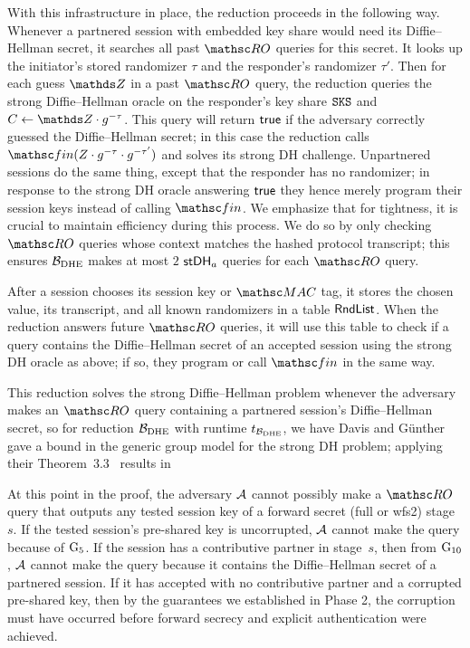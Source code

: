 With this infrastructure in place, the reduction proceeds in the following way.
Whenever a partnered session with embedded key share would need its Diffie--Hellman secret, it searches all past $\RO$ queries for this secret.
It looks up the initiator's stored randomizer $\tau$ and the responder's randomizer $\tau'$.
Then for each guess $\Z$ in a past $\RO$ query, the reduction queries the strong Diffie--Hellman oracle on the responder's key share $\mathtt{SKS}$ and $C \assign \Z \cdot g^{-\tau} $.
This query will return $\mathsf{true}$ if the adversary correctly guessed the Diffie--Hellman secret; in this case the reduction calls $\Finalize(Z \cdot g^{-\tau} \cdot g^{-\tau'})$ and solves its strong DH challenge.
Unpartnered sessions do the same thing, except that the responder has no randomizer; in response to the strong DH oracle answering $\mathsf{true}$ they hence merely program their session keys instead of calling $\Finalize$.
We emphasize that for tightness, it is crucial to maintain efficiency during this process.
We do so by only checking $\RO$ queries whose context matches the hashed protocol transcript; this ensures $\mathcal{B}_{\mathrm{DHE}}$ makes at most $2$ $\mathsf{stDH}_a$ queries for each $\RO$ query.

After a session chooses its session key or $\MAC$ tag, it stores the chosen value, its transcript, and all known randomizers in a table $\mathsf{RndList}$.
When the reduction answers future $\RO$ queries, it will use this table to check if a query contains the Diffie--Hellman secret of an accepted session using the strong DH oracle as above; if so, they program or call $\Finalize$ in the same way.

This reduction solves the strong Diffie--Hellman problem whenever the adversary makes an $\RO$ query containing a partnered session's Diffie--Hellman secret,
so for reduction $\mathcal{B}_{\mathrm{DHE}}$ with runtime $t_{\mathcal{B}_{\mathrm{DHE}}}$, we have
Davis and G{\"u}nther gave a bound in the generic group model for the strong DH problem; applying their Theorem~3.3~\cite{ACNS:DavGun21} results in
\smallskip


At this point in the proof, the adversary $\mathcal{A}$ cannot possibly make a $\RO$ query that outputs any tested session key of a forward secret (full or wfs2) stage~$s$.
If the tested session's pre-shared key is uncorrupted, $\mathcal{A}$ cannot make the query because of $\textnormal{G}_5$.
If the session has a contributive partner in stage~$s$, then from $\textnormal{G}_{10}$, $\mathcal{A}$ cannot make the query because it contains the Diffie--Hellman secret of a partnered session.
If it has accepted with no contributive partner and a corrupted pre-shared key, then by the guarantees we established in Phase 2, the corruption must have occurred before forward secrecy and explicit authentication were achieved.


